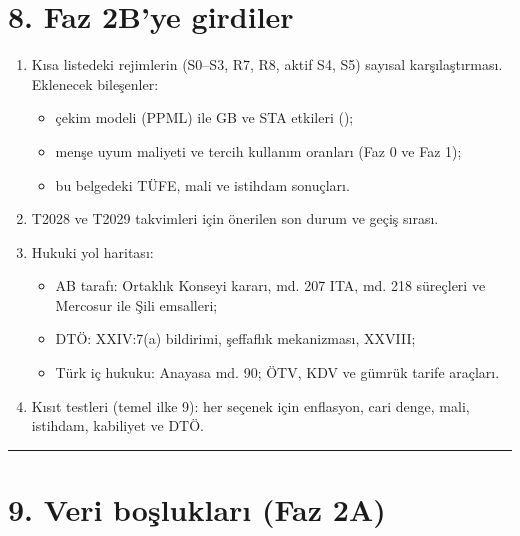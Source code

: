\hypertarget{02a_politika_uzayi-8-faz-2bye-girdiler}{%
\section{8. Faz 2B'ye girdiler}\label{02a_politika_uzayi-8-faz-2bye-girdiler}}

\begin{enumerate}
\def\labelenumi{\arabic{enumi}.}
\tightlist
\item
  Kısa listedeki rejimlerin (S0--S3, R7, R8, aktif S4, S5) sayısal karşılaştırması. Eklenecek bileşenler:

  \begin{itemize}
  \tightlist
  \item
    çekim modeli (PPML) ile GB ve STA etkileri ();
  \item
    menşe uyum maliyeti ve tercih kullanım oranları (Faz 0 ve Faz 1);
  \item
    bu belgedeki TÜFE, mali ve istihdam sonuçları.
  \end{itemize}
\item
  T2028 ve T2029 takvimleri için önerilen son durum ve geçiş sırası.
\item
  Hukuki yol haritası:

  \begin{itemize}
  \tightlist
  \item
    AB tarafı: Ortaklık Konseyi kararı, md. 207 ITA, md. 218 süreçleri ve Mercosur ile Şili emsalleri;
  \item
    DTÖ: XXIV:7(a) bildirimi, şeffaflık mekanizması, XXVIII;
  \item
    Türk iç hukuku: Anayasa md. 90; ÖTV, KDV ve gümrük tarife araçları.
  \end{itemize}
\item
  Kısıt testleri (temel ilke 9): her seçenek için enflasyon, cari denge, mali, istihdam, kabiliyet ve DTÖ.
\end{enumerate}

\begin{center}\rule{0.5\linewidth}{0.5pt}\end{center}

\hypertarget{02a_politika_uzayi-9-veri-boux15fluklarux131-faz-2a}{%
\section{9. Veri boşlukları (Faz 2A)}\label{02a_politika_uzayi-9-veri-boux15fluklarux131-faz-2a}}

